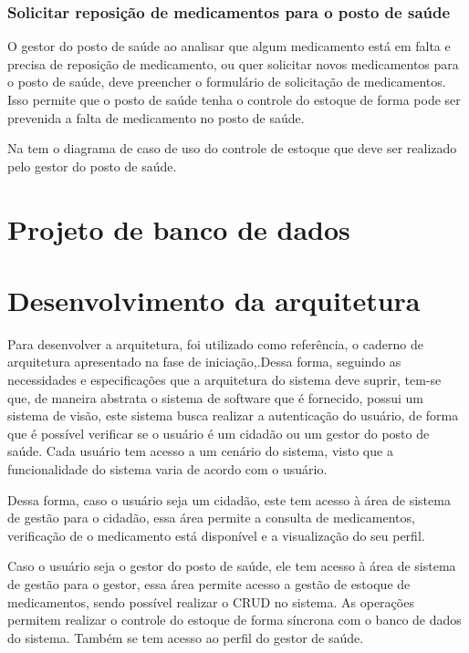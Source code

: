 \subsubsection{Solicitar reposição de medicamentos para o posto de saúde}

O gestor do posto de saúde ao analisar que algum medicamento está em falta e precisa de reposição de medicamento, ou quer solicitar novos medicamentos para o posto de saúde, deve preencher o formulário de solicitação de medicamentos. Isso permite que o posto de saúde tenha o controle do estoque de forma pode ser prevenida a falta de medicamento no posto de saúde.

Na  tem o diagrama de caso de uso do controle de estoque que deve ser realizado pelo gestor do posto de saúde.

%

\section{Projeto de banco de dados}
\section{Desenvolvimento da arquitetura}

Para desenvolver a arquitetura, foi utilizado como referência, o caderno de arquitetura apresentado na fase de iniciação,.Dessa forma, seguindo as necessidades e especificações que a arquitetura do sistema deve suprir, tem-se que, de maneira abstrata o sistema de software que é fornecido, possui um sistema de visão, este sistema busca realizar a autenticação do usuário, de forma que é possível verificar se o usuário é um cidadão ou um gestor do posto de saúde. Cada usuário tem acesso a um cenário do sistema, visto que a funcionalidade do sistema varia de acordo com o usuário. 

Dessa forma, caso o usuário seja um cidadão, este tem acesso à área de sistema de gestão para o cidadão, essa área permite a consulta de medicamentos, verificação de o medicamento está disponível e a visualização do seu perfil. 

Caso o usuário seja o gestor do posto de saúde, ele tem acesso à área de sistema de gestão para o gestor, essa área permite acesso a gestão de estoque de medicamentos, sendo possível realizar o \acrfull{CRUD} no sistema. As operações permitem realizar o controle do estoque de forma síncrona com o banco de dados do sistema. Também se tem acesso ao perfil do gestor de saúde.


%